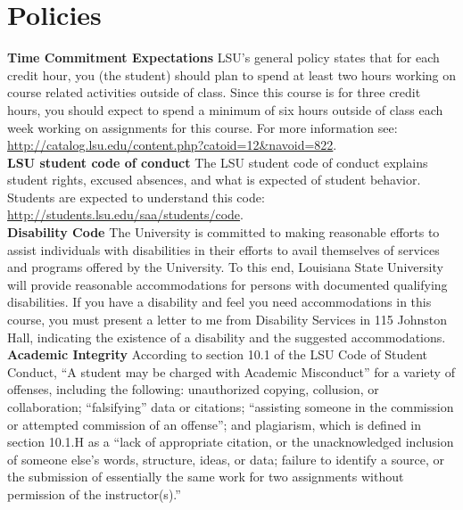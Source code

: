 \documentclass[11pt,article,oneside]{memoir}
\begin{document}

\section{Policies}

\noindent \textbf{Time Commitment Expectations}
LSU's general policy states that for each credit hour, you (the student) should plan to
spend at least two hours working on course related activities outside of class. Since this course is for three credit hours, you should expect to spend a minimum of six hours outside of class each week working on assignments for this course. For more information see: 
\url{http://catalog.lsu.edu/content.php?catoid=12&navoid=822}.\\

\noindent \textbf{LSU student code of conduct}
The LSU student code of conduct explains student rights, excused absences, and what is expected of student behavior. Students are expected to understand this code:  \url{http://students.lsu.edu/saa/students/code}.\\ %

\noindent \textbf{Disability Code}
The University is committed to making reasonable efforts to assist individuals with disabilities in
their efforts to avail themselves of services and programs offered by the University. To this end,
Louisiana State University will provide reasonable accommodations for persons with
documented qualifying disabilities. If you have a disability and feel you need accommodations in
this course, you must present a letter to me from Disability Services in 115 Johnston Hall,
indicating the existence of a disability and the suggested accommodations.\\

\noindent \textbf{Academic Integrity}
According to section 10.1 of the LSU Code of Student Conduct, ``A student may be charged with Academic Misconduct'' for a variety of offenses, including the following: unauthorized copying, collusion, or collaboration; ``falsifying'' data or citations; ``assisting someone in the commission or attempted commission of an offense''; and plagiarism, which is defined in section 10.1.H as a ``lack of appropriate citation, or the unacknowledged inclusion of someone else's words, structure, ideas, or data; failure to identify a source, or the submission of essentially the same work for two assignments without permission of the instructor(s).''\\
\end{document}
